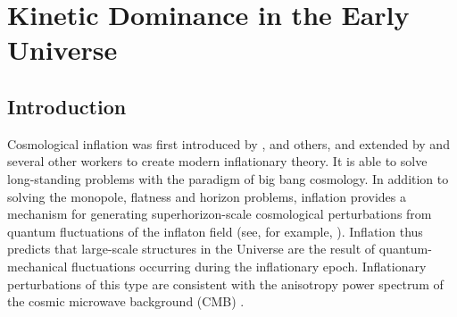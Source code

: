 \newcommand{\rhoph}{\rho_\phi}
\newcommand{\Pph}{P_\phi}


\newcommand{\Nflat}{N_\mathrm{e}}
\newcommand{\Nflatp}{\prm{N_\mathrm{e}}}
\newcommand{\Nflatpp}{\dprm{N_\mathrm{e}}}
\newcommand{\Hflat}{\dot{N}_\mathrm{e}}
\newcommand{\dHflat}{\ddot{N}_\mathrm{e}}


\def\tfrac#1#2{{\textstyle\frac{#1}{#2}}}


\newcommand{\difrac}[2]{\frac{d #1}{d #2}}    %

\newcommand{\abs}[1]{\left|#1\right|}  


\newcommand{\eref}[1]{\nolinebreak(\ref{#1})}  %
\newcommand{\Sref}[1]{Sec.\ \nolinebreak\ref{#1}}        %
\newcommand{\Fref}[1]{Fig.\ \nolinebreak\ref{#1}}         %





\chapter{Kinetic Dominance in the Early Universe}
\label{chap:kd}

\section{Introduction}

Cosmological inflation was first introduced by
\citet{starobinskii_spectrum_1979}, \citet{guth_inflationary_1981} and
others, and extended by \citet{linde_1982} and several other workers
to create modern inflationary theory. It is able to solve
long-standing problems with the paradigm of big bang cosmology. In
addition to solving the monopole, flatness and horizon problems,
inflation provides a mechanism for generating superhorizon-scale
cosmological perturbations from quantum fluctuations of the inflaton
field (see, for example, \citet{mukhanov_theory_1992}). Inflation thus
predicts that large-scale structures in the Universe are the result of
quantum-mechanical fluctuations occurring during the inflationary
epoch. Inflationary perturbations of this type are consistent with the
anisotropy power spectrum of the cosmic microwave background (CMB)
\citep{hinshaw_nine-year_2012,planck_collaboration_planck_2013}.

